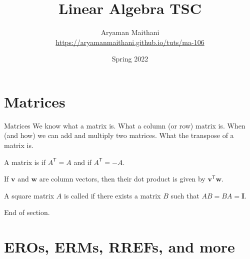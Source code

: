 \documentclass[dvipsnames]{beamer}
\title{Linear Algebra TSC}
\author[Aryaman Maithani]{\texorpdfstring{Aryaman Maithani\\\url{https://aryamanmaithani.github.io/tuts/ma-106}}{Aryaman Maithani}}
\date{Spring 2022}
\institute{IIT Bombay}
\newcommand{\TT}{\mathsf{T}}
\theoremstyle{definition}
\begin{document}
\begin{frame}
    \titlepage
\end{frame}


\section{Matrices}

\begin{frame}{Matrices}
    We know what a matrix is. What a column (or row) matrix is. When (and how) we can add and multiply two matrices. What the transpose of a matrix is. \pause

    A matrix is  if $A^{\TT} = A$ and  if $A^{\TT} = -A$. \pause

    If $\mathbf{v}$ and $\mathbf{w}$ are column vectors, then their dot product is given by $\mathbf{v}^{\TT} \mathbf{w}$. \pause

    A square matrix $A$ is called  if there exists a matrix $B$ such that $AB = BA = \mathbf{I}$. \pause

    \vspace{2cm}

    \begin{tcolorbox}
        \begin{center}
            End of section.
        \end{center}
    \end{tcolorbox}
\end{frame}

\section{EROs, ERMs, RREFs, and more}
\end{document}
